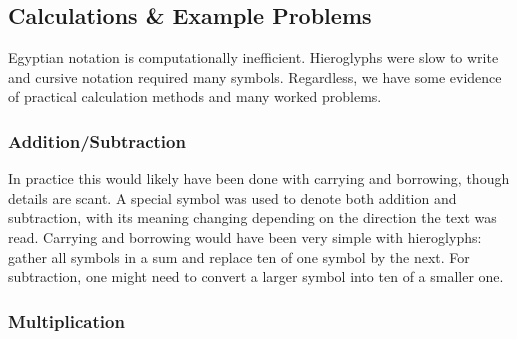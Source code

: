 \pagebreak[3]


\subsection*{Calculations \& Example Problems}

Egyptian notation is computationally inefficient. Hieroglyphs were slow to write and cursive notation required many symbols. Regardless, we have some evidence of practical calculation methods and many worked problems.


\subsubsection*{Addition/Subtraction}

In practice this would likely have been done with carrying and borrowing, though details are scant. A special symbol was used to denote both addition and subtraction, with its meaning changing depending on the direction the text was read.\smallbreak
Carrying and borrowing would have been very simple with hieroglyphs: gather all symbols in a sum and replace ten of one symbol by the next. For subtraction, one might need to convert a larger symbol into ten of a smaller one. 


\subsubsection*{Multiplication}

